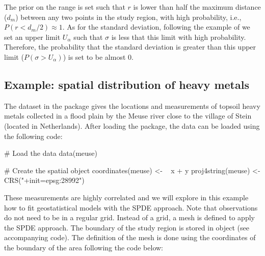 \medskip
The prior on the range is set such that $r$ is lower than half the maximum distance ($d_m$) between any two points in the study region, with high probability, i.e., $P(r < d_m / 2) \approx 1$. As for the standard deviation, following the example of \citet{Simpson2019Careful} we set an upper  limit $U_\alpha$ such that $\sigma$ is less that this limit with high probability. Therefore, the probability that the standard deviation is greater than this upper limit ($ P(\sigma > U_{\alpha})$) is set to be almost 0.







\subsection{Example: spatial distribution of heavy metals}

The  dataset in the  package gives the locations and measurements of topsoil heavy metals collected in a flood plain by the Meuse river close to the village of Stein (located in Netherlands). After loading the  package, the data can be loaded using the following code:

\begin{example*}
# Load the data
data(meuse)

# Create the spatial object
coordinates(meuse) <- ~ x + y
proj4string(meuse) <- CRS("+init=epsg:28992")
\end{example*}

These measurements are highly correlated and we will explore in this example how to fit geostatistical models with the SPDE approach. Note that observations do not need to be in a regular grid. Instead of a grid, a mesh is defined to apply the SPDE approach. The boundary of the study region is stored in object  (see accompanying code). The definition of the mesh is done using the coordinates of the boundary of the area following the code below:

